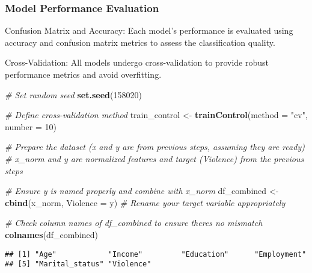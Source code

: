 \documentclass[
]{article}
\newenvironment{Shaded}{\begin{snugshade}}{\end{snugshade}}
\newcommand{\AttributeTok}[1]{\textcolor[rgb]{0.13,0.29,0.53}{#1}}
\newcommand{\CommentTok}[1]{\textcolor[rgb]{0.56,0.35,0.01}{\textit{#1}}}
\newcommand{\DecValTok}[1]{\textcolor[rgb]{0.00,0.00,0.81}{#1}}
\newcommand{\FunctionTok}[1]{\textcolor[rgb]{0.13,0.29,0.53}{\textbf{#1}}}
\newcommand{\NormalTok}[1]{#1}
\newcommand{\OtherTok}[1]{\textcolor[rgb]{0.56,0.35,0.01}{#1}}
\newcommand{\StringTok}[1]{\textcolor[rgb]{0.31,0.60,0.02}{#1}}
\begin{document}
\hypertarget{model-performance-evaluation}{%
\subsubsection{Model Performance
Evaluation}\label{model-performance-evaluation}}

Confusion Matrix and Accuracy: Each model's performance is evaluated
using accuracy and confusion matrix metrics to assess the classification
quality.

Cross-Validation: All models undergo cross-validation to provide robust
performance metrics and avoid overfitting.

\begin{Shaded}
\begin{Highlighting}[]
\CommentTok{\# Set random seed}
\FunctionTok{set.seed}\NormalTok{(}\DecValTok{158020}\NormalTok{)}

\CommentTok{\# Define cross{-}validation method}
\NormalTok{train\_control }\OtherTok{\textless{}{-}} \FunctionTok{trainControl}\NormalTok{(}\AttributeTok{method =} \StringTok{"cv"}\NormalTok{, }\AttributeTok{number =} \DecValTok{10}\NormalTok{)}

\CommentTok{\# Prepare the dataset (x and y are from previous steps, assuming they are ready)}
\CommentTok{\# x\_norm and y are normalized features and target (Violence) from the previous steps}

\CommentTok{\# Ensure y is named properly and combine with x\_norm}
\NormalTok{df\_combined }\OtherTok{\textless{}{-}} \FunctionTok{cbind}\NormalTok{(x\_norm, }\AttributeTok{Violence =}\NormalTok{ y)  }\CommentTok{\# Rename your target variable appropriately}

\CommentTok{\# Check column names of df\_combined to ensure there\textquotesingle{}s no mismatch}
\FunctionTok{colnames}\NormalTok{(df\_combined)}
\end{Highlighting}
\end{Shaded}

\begin{verbatim}
## [1] "Age"            "Income"         "Education"      "Employment"    
## [5] "Marital_status" "Violence"
\end{verbatim}
\end{document}

